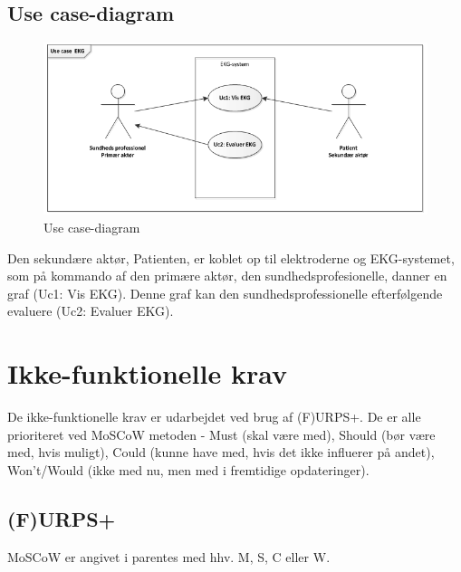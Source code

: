 \subsection{Use case-diagram}

\begin{figure}[htb]
	\centering
	\includegraphics[width=1\textwidth]{Figurer/Snip20150226_2}
	\caption{Use case-diagram}
	\label{fig:Use Cases}
\end{figure}

Den sekundære aktør, Patienten, er koblet op til elektroderne og EKG-systemet, som på kommando af den primære aktør, den sundhedsprofesionelle, danner en graf (Uc1: Vis EKG). Denne graf kan den sundhedsprofessionelle efterfølgende evaluere (Uc2: Evaluer EKG).

\section{Ikke-funktionelle krav}
De ikke-funktionelle krav er udarbejdet ved brug af (F)URPS+. De er alle prioriteret ved MoSCoW metoden - Must (skal være med), Should (bør være med, hvis muligt), Could (kunne have med, hvis det ikke influerer på andet), Won't/Would (ikke med nu, men med i fremtidige opdateringer). 

\subsection{(F)URPS+}
MoSCoW er angivet i parentes med hhv. M, S, C eller W.

